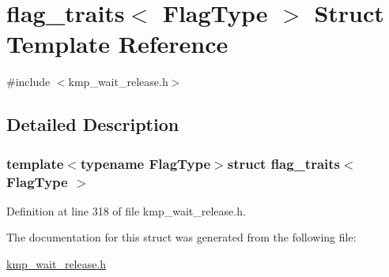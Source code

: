 \hypertarget{structflag__traits}{\section{flag\-\_\-traits$<$ Flag\-Type $>$ Struct Template Reference}
\label{structflag__traits}
}


{\ttfamily \#include $<$kmp\-\_\-wait\-\_\-release.\-h$>$}



\subsection{Detailed Description}
\subsubsection*{template$<$typename Flag\-Type$>$struct flag\-\_\-traits$<$ Flag\-Type $>$}



Definition at line 318 of file kmp\-\_\-wait\-\_\-release.\-h.



The documentation for this struct was generated from the following file\-:\begin{DoxyCompactItemize}
\item 
\hyperlink{kmp__wait__release_8h}{kmp\-\_\-wait\-\_\-release.\-h}\end{DoxyCompactItemize}
